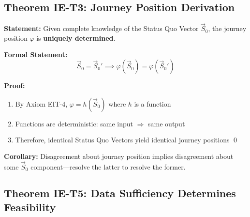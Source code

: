 \subsection{Theorem IE-T3: Journey Position Derivation}

\begin{tcolorbox}[colback=green!5!white, colframe=green!75!black,
    title=\textbf{Theorem IE-T3: Journey Position is Fully Determined}]

\textbf{Statement:} Given complete knowledge of the Status Quo Vector $\vec{S}_0$, the journey position $\varphi$ is \textbf{uniquely determined}.

\textbf{Formal Statement:}
\begin{equation}
\vec{S}_0 = \vec{S}_0' \implies \varphi(\vec{S}_0) = \varphi(\vec{S}_0')
\end{equation}

\textbf{Proof:}
\begin{enumerate}[nosep]
    \item By Axiom EIT-4, $\varphi = h(\vec{S}_0)$ where $h$ is a function
    \item Functions are deterministic: same input $\Rightarrow$ same output
    \item Therefore, identical Status Quo Vectors yield identical journey positions \qed
\end{enumerate}

\textbf{Corollary:} Disagreement about journey position implies disagreement about some $\vec{S}_0$ component---resolve the latter to resolve the former.

\end{tcolorbox}

\subsection{Theorem IE-T5: Data Sufficiency Determines Feasibility}

